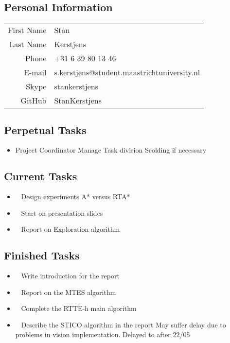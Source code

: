 \subsection{Personal Information}
\begin{table}[h!]
	\begin{tabular}{rl}
	First Name 	& Stan\\
	Last Name	& Kerstjens\\
	Phone		& +31 6 39 80 13 46\\
	E-mail		& s.kerstjens@student.maastrichtuniversity.nl\\
	Skype		& stankerstjens\\
	GitHub		& StanKerstjens
\end{tabular}
\end{table}

\subsection{Perpetual Tasks}
\begin{itemize}
	\item Project Coordinator
		\subitem Manage Task division
		\subitem Scolding if necessary
\end{itemize}

\subsection{Current Tasks}
\begin{itemize}
	\item~
		Design experiments
		\subitem A* versus RTA*
	\item~
		Start on presentation slides
	\item~
		Report on Exploration algorithm
\end{itemize}

\subsection{Finished Tasks}
\begin{itemize}
	\item~\marginpar{}
		Write introduction for the report
	\item~
		Report on the MTES algorithm
	\item~
		Complete the RTTE-h main algorithm
	\item~
	Describe the STICO algorithm in the report
		\subitem May suffer delay due to problems in vision implementation.
		\subitem Delayed to after 22/05
\end{itemize}